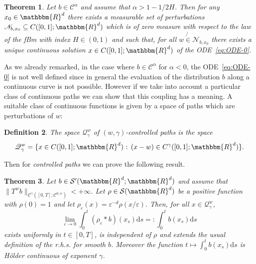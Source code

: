\documentclass[a4paper,11pt]{article}
\newcommand{\mathd}{\mathrm{d}}
\newcommand{\tmtextit}[1]{{\itshape{#1}}}
\newtheorem{theorem}{Theorem}[section]
\newtheorem{definition}[theorem]{Definition}
\newcommand{\CC}{\mathscr C}
\newcommand{\CQ}{\mathscr Q}
\newcommand{\CN}{\mathscr N}
\begin{document}
\begin{theorem}
  \label{th:ode-better-0}Let $b \in \CC^{\alpha}$ and assume that $\alpha
  >1-1/2H$. Then for any $x_{0} \in \mathbbm{R}^{d}$ there exists a measurable
  set of perturbations $\CN_{b,x_{0}} \subseteq C ( [ 0,1 ]
  ;\mathbbm{R}^{d} )$ which is of zero measure with respect to the law of the
  fBm with index $H \in ( 0,1 )$ and such that, for all $w \not{\in}
  \CN_{b,x_{0}}$ there exists a unique continuous solution $x \in C (
  [ 0,1 ] ;\mathbbm{R}^{d} )$ of the ODE~{\eqref{eq:ODE-0}}.
\end{theorem}

As we already remarked, in the case where $b \in \CC^{\alpha}$ for $\alpha
<0$, the ODE~{\eqref{eq:ODE-0}} is not well defined since in general the
evaluation of the distribution $b$ along a continuous curve is not possible.
However if we take into account a particular class of continuous paths we can
show that this coupling has a meaning. A suitable class of continuous
functions is given by a space of paths which are perturbations of $w$:

\begin{definition}
  The space $\CQ^{w}_{\gamma}$ of $(w, \gamma )$-controlled paths is
  the space
  \[ \CQ^{w}_{\gamma} = \{x \in C ( [ 0,1 ] ;\mathbbm{R}^{d} )  
     \text{  : } (x-w) \in C^{\gamma} ( [ 0,1 ] ;\mathbbm{R}^{d} ) \} . \]
\end{definition}

Then for \tmtextit{controlled paths} we can prove the following result.

\begin{theorem}
  \label{th:def-of-int-b}Let $b \in \mathcal{S}' ( \mathbbm{R}^{d}
  ;\mathbbm{R}^{d} )$ and assume that $\| T^{w} b \|_{\CC^{\gamma} \left( [
  0,T ] ; \CC^{0, \psi} \right)} <+ \infty$. Let $\rho \in \mathcal{S} (
  \mathbbm{R}^{d} )$ be a positive function with $\rho ( 0 ) =1$ and let
  $\rho_{\varepsilon} ( x ) = \varepsilon^{-d} \rho ( x/ \varepsilon )$. Then,
  for all $x \in \CQ^{w}_{\gamma}$,
  \begin{equation}
    \lim_{\varepsilon \rightarrow 0} \int_{0}^{t} ( \rho_{\varepsilon} \ast b
    ) ( x_{s} ) \mathd s=: \int_{0}^{t} b ( x_{s} ) \mathd s
    \label{eq:limiting-procedure}
  \end{equation}
  exists uniformly in $t \in [ 0,T ]$, is independent of $\rho$ and extends
  the usual definition of the r.h.s. for smooth $b$. Moreover the function $t
  \mapsto \int_{0}^{t} b ( x_{s} ) \mathd s$ is H\"older continuous of exponent
  $\gamma$. 
\end{theorem}
\end{document}

